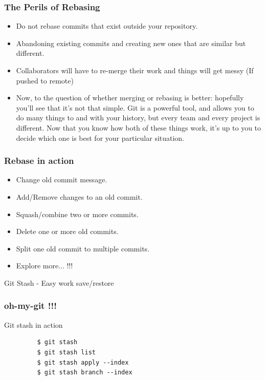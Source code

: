 \documentclass[10pt]{beamer}
\begin{document}
\begin{frame}
  \frametitle{The Perils of Rebasing}
  \begin{itemize}
    \item Do not rebase commits that \alert<4>{exist outside your repository}.
    \pause
    \item Abandoning existing commits and \alert<4>{creating new ones that are similar but different}.
    \pause
    \item Collaborators will have to \alert<4>{re-merge their work} and things will get messy (If pushed to remote)
    \pause
    \item Now, to the question of whether merging or rebasing is better: hopefully you’ll see that it’s not that simple. Git is a powerful tool, and allows you to do many things to and with your history, but every team and every project is different. Now that you know how both of these things work, it’s up to you to decide which
 one is best for your particular situation.
  \end{itemize}
\end{frame}

\begin{frame}
  \frametitle{Rebase in action}
  \begin{itemize}
    \item Change old commit message.
    \pause
    \item Add/Remove changes to an old commit.
    \pause
    \item Squash/combine two or more commits.
    \pause
    \item Delete one or more old commits.
    \pause
    \item Split one old commit to multiple commits.
    \pause
    \item \alert{Explore more... !!!}
  \end{itemize}
\end{frame}

\begin{frame}
  \begin{center}
    \Huge{Git Stash - Easy work save/restore }
  \end{center}
\end{frame}

\begin{frame}[fragile]
  \frametitle{oh-my-git !!!}
    \begin{block}{Git stash in action}
      \begin{verbatim}
         $ git stash
         $ git stash list
         $ git stash apply --index
         $ git stash branch --index
    \end{verbatim}
    \end{block}
\end{frame}
\end{document}
